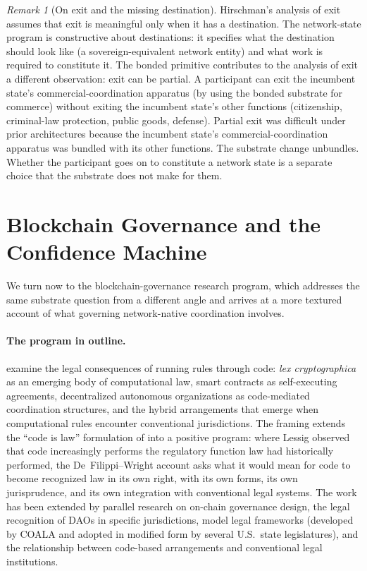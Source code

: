 \documentclass[11pt,a4paper]{article}
\theoremstyle{remark}
\newtheorem{remark}{Remark}[section]
\begin{document}
\begin{remark}[On exit and the missing destination]
Hirschman's analysis of exit assumes that exit is meaningful
only when it has a destination. The network-state program is
constructive about destinations: it specifies what the
destination should look like (a sovereign-equivalent network
entity) and what work is required to constitute it. The bonded
primitive contributes to the analysis of exit a different
observation: exit can be partial. A participant can exit the
incumbent state's commercial-coordination apparatus (by using
the bonded substrate for commerce) without exiting the
incumbent state's other functions (citizenship, criminal-law
protection, public goods, defense). Partial exit was difficult
under prior architectures because the incumbent state's
commercial-coordination apparatus was bundled with its other
functions. The substrate change unbundles. Whether the
participant goes on to constitute a network state is a separate
choice that the substrate does not make for them.
\end{remark}

\section{Blockchain Governance and the Confidence Machine}
\label{sec:de-filippi}

We turn now to the blockchain-governance research program, which
addresses the same substrate question from a different angle and
arrives at a more textured account of what governing
network-native coordination involves.

\paragraph{The program in outline.}
\citet{defilippi_wright_2018} examine the legal consequences of
running rules through code: \emph{lex cryptographica} as an
emerging body of computational law, smart contracts as
self-executing agreements, decentralized autonomous organizations
as code-mediated coordination structures, and the
hybrid arrangements that emerge when computational rules
encounter conventional jurisdictions. The framing extends the
``code is law'' formulation of \citet{lessig2006code} into a
positive program: where Lessig observed that code increasingly
performs the regulatory function law had historically performed,
the De~Filippi--Wright account asks what it would mean for code
to become recognized law in its own right, with its own forms,
its own jurisprudence, and its own integration with conventional
legal systems. The work has been
extended by parallel research on
on-chain governance design, the legal recognition of DAOs in
specific jurisdictions, model legal frameworks (developed by
COALA and adopted in modified form by several U.S.~state
legislatures), and the relationship between code-based
arrangements and conventional legal institutions.
\end{document}
